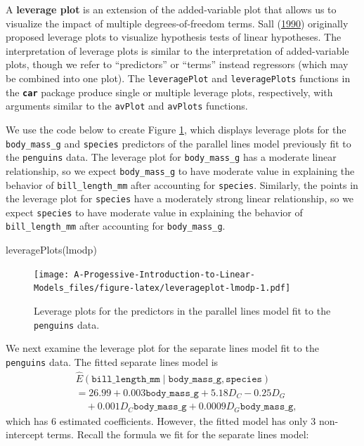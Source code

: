 \documentclass[
]{book}
\newenvironment{Shaded}{\begin{snugshade}}{\end{snugshade}}
\newcommand{\FunctionTok}[1]{\textcolor[rgb]{0.00,0.00,0.00}{#1}}
\newcommand{\NormalTok}[1]{#1}
\theoremstyle{definition}
\theoremstyle{definition}
\theoremstyle{definition}
\theoremstyle{definition}
\theoremstyle{remark}
\begin{document}
A \textbf{leverage plot} is an extension of the added-variable plot that
allows us to visualize the impact of multiple degrees-of-freedom terms.
Sall (\protect\hyperlink{ref-sall1990leverage}{1990}) originally proposed leverage plots to visualize
hypothesis tests of linear hypotheses. The interpretation of leverage
plots is similar to the interpretation of added-variable plots, though
we refer to ``predictors'' or ``terms'' instead regressors (which may be
combined into one plot). The \texttt{leveragePlot} and \texttt{leveragePlots}
functions in the \textbf{\texttt{car}} package produce single or multiple leverage
plots, respectively, with arguments similar to the \texttt{avPlot} and
\texttt{avPlots} functions.

We use the code below to create Figure \ref{fig:leverageplot-lmodp},
which displays leverage plots for the \texttt{body\_mass\_g} and \texttt{species}
predictors of the parallel lines model previously fit to the \texttt{penguins}
data. The leverage plot for \texttt{body\_mass\_g} has a moderate linear
relationship, so we expect \texttt{body\_mass\_g} to have moderate value in
explaining the behavior of \texttt{bill\_length\_mm} after accounting for
\texttt{species}. Similarly, the points in the leverage plot for \texttt{species} have
a moderately strong linear relationship, so we expect \texttt{species} to have
moderate value in explaining the behavior of \texttt{bill\_length\_mm} after
accounting for \texttt{body\_mass\_g}.

\begin{Shaded}
\begin{Highlighting}[]
\FunctionTok{leveragePlots}\NormalTok{(lmodp)}
\end{Highlighting}
\end{Shaded}

\begin{figure}
\centering
\texttt{[image: A-Progessive-Introduction-to-Linear-Models\_files/figure-latex/leverageplot-lmodp-1.pdf]}
\caption{\label{fig:leverageplot-lmodp}Leverage plots for the predictors in the parallel lines model fit to the \texttt{penguins} data.}
\end{figure}

We next examine the leverage plot for the separate lines model fit to
the \texttt{penguins} data. The fitted separate lines model is\[
\begin{aligned}
&\hat{E}(\mathtt{bill\_length\_mm} \mid \mathtt{body\_mass\_g}, \mathtt{species}) \\
&= 26.99 + 0.003 \mathtt{body\_mass\_g} + 5.18 D_C - 0.25 D_G \\
&\quad + 0.001 D_C \mathtt{body\_mass\_g} + 0.0009 D_G \mathtt{body\_mass\_g},
\end{aligned}
\]which has 6 estimated coefficients. However, the fitted model has only
3 non-intercept terms. Recall the formula we fit for the separate lines
model:
\end{document}

